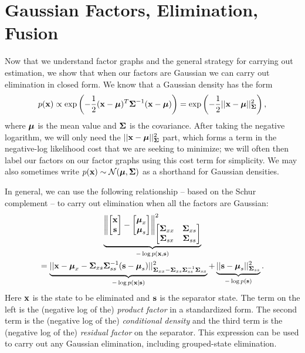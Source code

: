 \section{Gaussian Factors, Elimination, Fusion}
\label{sec:fgelimfus}

Now that we understand factor graphs and the general strategy for carrying out estimation, we show that when our factors are Gaussian we can carry out elimination in closed form.  We know that a Gaussian density has the form
\begin{equation}
p(\mathbf{x}) \propto \exp\left( -\frac{1}{2} (\mathbf{x} - {\boldsymbol{\mu}})^T {\boldsymbol{\Sigma}}^{-1} (\mathbf{x} - {\boldsymbol{\mu}}) \right) = \exp\left( -\frac{1}{2} || \mathbf{x} - {\boldsymbol{\mu}} ||^2_{\boldsymbol{\Sigma}} \right),
\end{equation}
where ${\boldsymbol{\mu}}$ is the mean value and ${\boldsymbol{\Sigma}}$ is the covariance.
After taking the negative logarithm, we will only need the $|| \mathbf{x} - {\boldsymbol{\mu}} ||^2_{\boldsymbol{\Sigma}}$ part, which forms a term in the negative-log likelihood cost that we are seeking to minimize; we will often then label our factors on our factor graphs using this cost term for simplicity.  We may also sometimes write $p(\mathbf{x}) \sim \mathcal{N}({\boldsymbol{\mu}}, {\boldsymbol{\Sigma}})$ as a shorthand for Gaussian densities.

In general, we can use the following relationship -- based on the Schur complement -- to carry out elimination when all the factors are Gaussian:
\begin{multline}\label{eq:gausselim}
\underbrace{\left\| \begin{bmatrix} \mathbf{x} \\ \mathbf{s} \end{bmatrix} - \begin{bmatrix} {\boldsymbol{\mu}}_x \\ {\boldsymbol{\mu}}_s \end{bmatrix} \right\|^2_{\begin{bmatrix} {\boldsymbol{\Sigma}}_{xx} & {\boldsymbol{\Sigma}}_{xs} \\ {\boldsymbol{\Sigma}}_{sx} & {\boldsymbol{\Sigma}}_{ss} \end{bmatrix}} }_{-\log p(\mathbf{x}, \mathbf{s})} \\ = \underbrace{|| \mathbf{x} - {\boldsymbol{\mu}}_x - {\boldsymbol{\Sigma}}_{xs} {\boldsymbol{\Sigma}}_{ss}^{-1} (\mathbf{s} - {\boldsymbol{\mu}}_s) ||^2_{{\boldsymbol{\Sigma}}_{xx} - {\boldsymbol{\Sigma}}_{xs} {\boldsymbol{\Sigma}}_{ss}^{-1} {\boldsymbol{\Sigma}}_{sx}}}_{-\log p(\mathbf{x} | \mathbf{s})} + \underbrace{|| \mathbf{s} - {\boldsymbol{\mu}}_s ||^2_{{\boldsymbol{\Sigma}}_{ss}}}_{-\log p(\mathbf{s})}. \\
\end{multline}
Here $\mathbf{x}$ is the state to be eliminated and $\mathbf{s}$ is the separator state.  The term on the left is the (negative log of the) {\em product factor} in a standardized form.  The second term is the (negative log of the) {\em conditional density} and the third term is the (negative log of the) {\em residual factor} on the separator.  This expression can be used to carry out any Gaussian elimination, including grouped-state elimination. 

